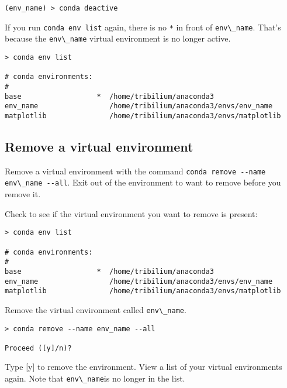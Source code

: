 \documentclass{book}
\newcommand{\passthrough}[1]{#1}
\begin{document}
\begin{lstlisting}
(env_name) > conda deactive
\end{lstlisting}

If you run \passthrough{\lstinline!conda env list!} again, there is no
\passthrough{\lstinline!*!} in front of
\passthrough{\lstinline!env\_name!}. That's because the
\passthrough{\lstinline!env\_name!} virtual environment is no longer
active.

\begin{lstlisting}
> conda env list

# conda environments:
#
base                  *  /home/tribilium/anaconda3
env_name                 /home/tribilium/anaconda3/envs/env_name
matplotlib               /home/tribilium/anaconda3/envs/matplotlib
\end{lstlisting}
    




    
        \hypertarget{remove-a-virtual-environment}{%
\subsection{Remove a virtual
environment}\label{remove-a-virtual-environment}}

Remove a virtual environment with the command
\passthrough{\lstinline!conda remove --name env\_name --all!}. Exit out
of the environment to want to remove before you remove it.

Check to see if the virtual environment you want to remove is present:

\begin{lstlisting}
> conda env list

# conda environments:
#
base                  *  /home/tribilium/anaconda3
env_name                 /home/tribilium/anaconda3/envs/env_name
matplotlib               /home/tribilium/anaconda3/envs/matplotlib
\end{lstlisting}

Remove the virtual environment called
\passthrough{\lstinline!env\_name!}.

\begin{lstlisting}
> conda remove --name env_name --all

Proceed ([y]/n)?
\end{lstlisting}

Type {[}y{]} to remove the environment. View a list of your virtual
environments again. Note that \passthrough{\lstinline!env\_name!}is no
longer in the list.
\end{document}

